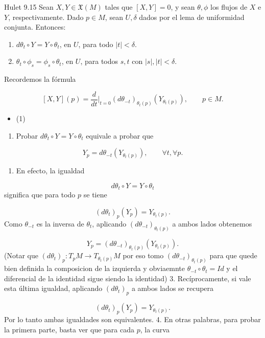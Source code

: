 \label{blk:311f86}
\begin{bookproposition}{Hulet 9.15}
Sean $X,Y\in\mathfrak{X}(M)$ tales que $[X,Y]=0$, y sean $\theta,\phi$ los flujos de $X$ e $Y$, respectivamente. Dado $p\in M$, sean $U,\delta$ dados por el lema de uniformidad conjunta. Entonces:

\begin{enumerate}
\item $d\theta_t\circ Y=Y\circ\theta_t$, en $U$, para todo $|t|<\delta$.
\item $\theta_t\circ\phi_s=\phi_s\circ\theta_t$, en $U$, para todos $s,t$ con $|s|,|t|<\delta$.
\end{enumerate}
\end{bookproposition}
\begin{bookproof}{}
Recordemos la fórmula

\[
[X,Y](p)=\frac{d}{dt}\bigg|_{t=0}(d\theta_{-t})_{\theta_{t}(p)}\left(Y_{\theta_t(p)}\right),\qquad p\in M.
\]
\begin{itemize}
\item (1)
\end{itemize}
\begin{enumerate}
\item Probar $d\theta_t\circ Y=Y\circ\theta_t$ equivale a probar que
\end{enumerate}
\[
Y_p=d\theta_{-t}\left(Y_{\theta_t(p)}\right),\qquad \forall t,\forall p.
\]
\begin{enumerate}[start=2]
\item En efecto, la igualdad
\end{enumerate}
\[
d\theta_t\circ Y=Y\circ\theta_t
\]
significa que para todo $p$ se tiene

\[
(d\theta_t)_p(Y_p)=Y_{\theta_t(p)}.
\]
Como $\theta_{-t}$ es la inversa de $\theta_t$, aplicando $(d\theta_{-t})_{\theta_t(p)}$ a ambos lados obtenemos

\[
Y_p=(d\theta_{-t})_{\theta_t(p)}(Y_{\theta_t(p)}).
\]
(Notar que $(d\theta_{t})_{p}:T_{p}M\rightarrow T_{\theta_{t}(p)}M$ por eso tomo $(d\theta_{-t})_{\theta_t(p)}$ para que quede bien definida la composicion de la izquierda y obviaemnte $\theta_{-t}\circ\theta_{t}=Id$ y el diferencial de la identidad sigue siendo la identidad) 3. Recíprocamente, si vale esta última igualdad, aplicando $(d\theta_t)_p$ a ambos lados se recupera

\[
(d\theta_t)_p(Y_p)=Y_{\theta_t(p)}.
\]
Por lo tanto ambas igualdades son equivalentes. 4. En otras palabras, para probar la primera parte, basta ver que para cada $p$, la curva


\end{bookproof}
